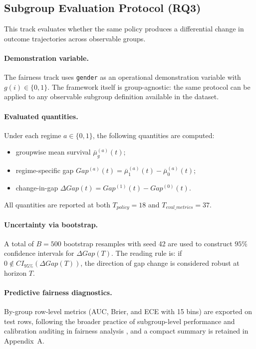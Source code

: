 \subsection{Subgroup Evaluation Protocol (RQ3)}
\label{subsec:fairness_eval}

This track evaluates whether the same policy produces a differential change in outcome trajectories across observable groups.

\paragraph*{Demonstration variable.}
The fairness track uses \texttt{gender} as an operational demonstration variable with $g(i)\in\{0,1\}$. The framework itself is group-agnostic: the same protocol can be applied to any observable subgroup definition available in the dataset.

\paragraph*{Evaluated quantities.}
Under each regime $a\in\{0,1\}$, the following quantities are computed:
\begin{itemize}
\item groupwise mean survival $\bar\mu_g^{(a)}(t)$;
\item regime-specific gap $Gap^{(a)}(t)=\bar\mu_1^{(a)}(t)-\bar\mu_0^{(a)}(t)$;
\item change-in-gap $\Delta Gap(t)=Gap^{(1)}(t)-Gap^{(0)}(t)$.
\end{itemize}
All quantities are reported at both $T_{policy}=18$ and $T_{eval\_metrics}=37$.

\paragraph*{Uncertainty via bootstrap.}
A total of $B=500$ bootstrap resamples with seed 42 are used to construct $95\%$ confidence intervals for $\Delta Gap(T)$. The reading rule is:
if $0\notin CI_{95\%}(\Delta Gap(T))$, the direction of gap change is considered robust at horizon $T$.

\paragraph*{Predictive fairness diagnostics.}
By-group row-level metrics (AUC, Brier, and ECE with 15 bins) are exported on test rows, following the broader practice of subgroup-level performance and calibration auditing in fairness analysis \cite{Lu2022ReliabilityFairnessAudit,Opoku2025AccuracyFairness}, and a compact summary is retained in Appendix~A.

